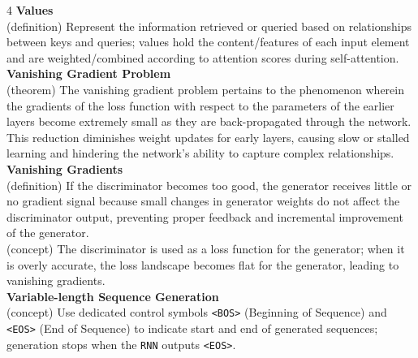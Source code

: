 \documentclass[8pt]{extarticle}
\begin{document}
\begin{multicols}{4}
\vspace{2pt}\textbf{Values}\\
(definition) Represent the information retrieved or queried based on relationships between keys and queries; values hold the content/features of each input element and are weighted/combined according to attention scores during self-attention.\\
\vspace{2pt}\textbf{Vanishing Gradient Problem}\\
(theorem) The vanishing gradient problem pertains to the phenomenon wherein the gradients of the loss function with respect to the parameters of the earlier layers become extremely small as they are back-propagated through the network. This reduction diminishes weight updates for early layers, causing slow or stalled learning and hindering the network's ability to capture complex relationships.\\
\vspace{2pt}\textbf{Vanishing Gradients}\\
(definition) If the discriminator becomes too good, the generator receives little or no gradient signal because small changes in generator weights do not affect the discriminator output, preventing proper feedback and incremental improvement of the generator.\\
(concept) The discriminator is used as a loss function for the generator; when it is overly accurate, the loss landscape becomes flat for the generator, leading to vanishing gradients.\\
\vspace{2pt}\textbf{Variable-length Sequence Generation}\\
(concept) Use dedicated control symbols \texttt{<BOS>} (Beginning of Sequence) and \texttt{<EOS>} (End of Sequence) to indicate start and end of generated sequences; generation stops when the \texttt{RNN} outputs \texttt{<EOS>}.\\


\end{multicols}
\end{document}
